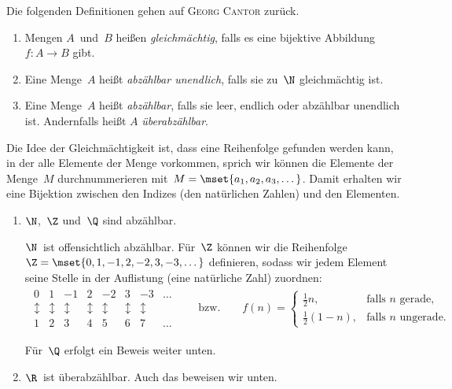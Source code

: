 \documentclass[a4paper]{article}
\begin{document}
Die folgenden Definitionen gehen auf \textsc{Georg Cantor} zurück.

\begin{definition}\leavevmode
    \begin{enumerate}
        \item Mengen $A$~und~$B$ heißen \emph{gleichmächtig}, falls es eine bijektive Abbildung $f\colon A \to B$ gibt.
        \item Eine Menge~$A$ heißt \emph{abzählbar unendlich}, falls sie zu~$\N$ gleichmächtig ist.
        \item Eine Menge~$A$ heißt \emph{abzählbar}, falls sie leer, endlich oder abzählbar unendlich ist. Andernfalls heißt $A$ \emph{überabzählbar}.
    \end{enumerate}
\end{definition}

Die Idee der Gleichmächtigkeit ist, dass eine Reihenfolge gefunden werden kann, in der alle Elemente der Menge vorkommen, sprich wir können die Elemente der Menge~$M$ durchnummerieren mit~$M = \mset{a_1, a_2, a_3, \dots}$. Damit erhalten wir eine Bijektion zwischen den Indizes (den natürlichen Zahlen) und den Elementen.


\begin{example}\leavevmode
    \begin{enumerate}
        \item $\N$,~$\Z$ und~$\Q$ sind abzählbar.

              $\N$~ist offensichtlich abzählbar. Für~$\Z$ können wir die Reihenfolge $\Z = \mset{0, 1, -1, 2, -2, 3, -3, \dots}$ definieren, sodass wir jedem Element seine Stelle in der Auflistung (eine natürliche Zahl) zuordnen:
              \begin{gather*}
                  \begin{matrix}
                      0            & 1            & -1           & 2            & -2           & 3            & -3           & \dots \\
                      \updownarrow & \updownarrow & \updownarrow & \updownarrow & \updownarrow & \updownarrow & \updownarrow &       \\
                      1            & 2            & 3            & 4            & 5            & 6            & 7            & \dots
                  \end{matrix}
                  \qquad\text{bzw.}\qquad
                  f(n) = \begin{cases}
                      \frac{1}{2}n,     & \text{falls $n$~gerade},   \\
                      \frac{1}{2}(1-n), & \text{falls $n$~ungerade}.
                  \end{cases}
              \end{gather*}

              Für~$\Q$ erfolgt ein Beweis weiter unten.
        \item $\R$~ist überabzählbar. Auch das beweisen wir unten.
    \end{enumerate}
\end{example}
\end{document}
